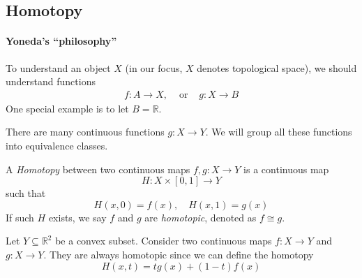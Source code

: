 \subsection{Homotopy}
\paragraph{Yoneda's ``philosophy''}
To understand an object $X$ (in our focus, $X$ denotes topological space), we should understand functions
\[
\begin{array}{lll}
f:A\to X,
&
\text{ or }
&
g:X\to B
\end{array}
\]
One special example is to let $B=\mathbb{R}$.

There are many continuous functions $g:X\to Y$.
We will group all these functions into equivalence classes.

\begin{definition}[Homotopy]
A \emph{Homotopy} between two continuous maps $f,g:X\to Y$ is a continuous map
\[
H:X\times[0,1]\to Y
\]
such that 
\[
H(x,0)=f(x),\quad
H(x,1)=g(x)
\]
If such $H$ exists, we say $f$ and $g$ are \emph{homotopic}, denoted as $f\cong g$.
\end{definition}

\begin{example}
Let $Y\subseteq\mathbb{R}^2$ be a convex subset.
Consider two continuous maps $f:X\to Y$ and $g:X\to Y$.
They are always homotopic since we can define the homotopy
\[
H(x,t) = tg(x) + (1-t)f(x)
\]
\end{example}

